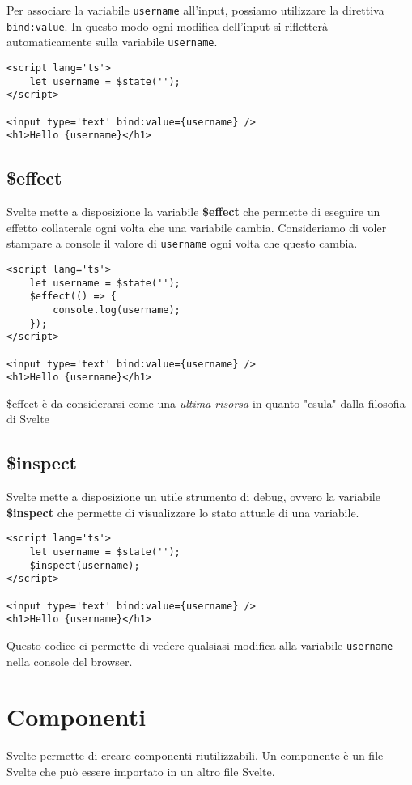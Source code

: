 \documentclass[12pt]{article}
\newcommand{\important}[1]{\textcolor{accent}{\textbf{#1}}}
\begin{document}
Per associare la variabile \texttt{username} all'input, 
possiamo utilizzare la direttiva \texttt{bind:value}.
In questo modo ogni modifica dell'input si rifletterà automaticamente
sulla variabile \texttt{username}.

\begin{verbatim}
<script lang='ts'>
    let username = $state('');
</script>

<input type='text' bind:value={username} />
<h1>Hello {username}</h1>
\end{verbatim}

\subsection{\$effect}
Svelte mette a disposizione la variabile \important{\$effect} che permette di
eseguire un effetto collaterale ogni volta che una variabile cambia.
Consideriamo di voler stampare a console il valore di \texttt{username} ogni volta
che questo cambia.

\begin{verbatim}
<script lang='ts'>
    let username = $state('');
    $effect(() => {
        console.log(username);
    });
</script>

<input type='text' bind:value={username} />
<h1>Hello {username}</h1>
\end{verbatim}
\begin{highlight}
    \$effect è da considerarsi come una \textit{ultima risorsa}
    in quanto "esula" dalla filosofia di Svelte
\end{highlight}

\subsection{\$inspect}
Svelte mette a disposizione un utile strumento di debug,
ovvero la variabile \important{\$inspect} che permette di visualizzare
lo stato attuale di una variabile.
\begin{verbatim}
<script lang='ts'>
    let username = $state('');
    $inspect(username);
</script>

<input type='text' bind:value={username} />
<h1>Hello {username}</h1>
\end{verbatim}
Questo codice ci permette di vedere qualsiasi modifica alla 
variabile \texttt{username} nella console del browser.

\section{Componenti}
Svelte permette di creare componenti riutilizzabili.
Un componente è un file Svelte che può essere importato in un altro file Svelte.
\end{document}
